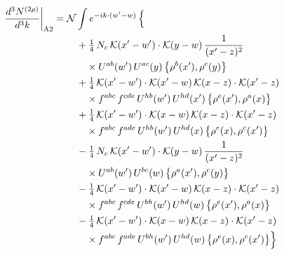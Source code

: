 \documentclass[10pt]{article}
\numberwithin{equation}{section}
\newcommand{\KK}{\mathcal K}
\newcommand{\NN}{\mathcal N}
\begin{document}
\begin{align}
\frac{d^3N^{(2\rho)}}{d^3k}\bigg|_{\rm A2}={}&\NN\int e^{-ik\cdot(w'-w)}\,\Big\{\notag\\
&\quad +\tfrac14\,N_{c}\,\KK(x'-w')\cdot\KK(y-w)\,\frac{1}{(x'-z)^2}\notag\\
&\qquad\times U^{ab}(w')\,U^{ac}(y)\,\big\{\rho^{b}(x'),\rho^{c}(y)\big\}\notag\\
&\quad +\tfrac14\,\KK(x'-w')\cdot\KK(x'-w)\,\KK(x-z)\cdot\KK(x'-z)\notag\\
&\qquad\times f^{abc}\,f^{cde}\,U^{hb}(w')\,U^{hd}(x')\,\big\{\rho^{e}(x'),\rho^{a}(x)\big\}\notag\\
&\quad +\tfrac14\,\KK(x'-w')\cdot\KK(x-w)\,\KK(x-z)\cdot\KK(x'-z)\notag\\
&\qquad\times f^{abc}\,f^{ade}\,U^{hb}(w')\,U^{hd}(x)\,\big\{\rho^{e}(x),\rho^{c}(x')\big\}\notag\\
&\quad -\tfrac14\,N_{c}\,\KK(x'-w')\cdot\KK(y-w)\,\frac{1}{(x'-z)^2}\notag\\
&\qquad\times U^{ab}(w')\,U^{bc}(w)\,\big\{\rho^{a}(x'),\rho^{c}(y)\big\}\notag\\
&\quad -\tfrac14\,\KK(x'-w')\cdot\KK(x'-w)\,\KK(x-z)\cdot\KK(x'-z)\notag\\
&\qquad\times f^{abc}\,f^{cde}\,U^{bh}(w')\,U^{hd}(w)\,\big\{\rho^{e}(x'),\rho^{a}(x)\big\}\notag\\
&\quad -\tfrac14\,\KK(x'-w')\cdot\KK(x-w)\,\KK(x-z)\cdot\KK(x'-z)\notag\\
&\qquad\times f^{abc}\,f^{ade}\,U^{bh}(w')\,U^{hd}(w)\,\big\{\rho^{e}(x),\rho^{c}(x')\big\}\Big\}\label{eq:sum-A2}
\end{align}
\end{document}
